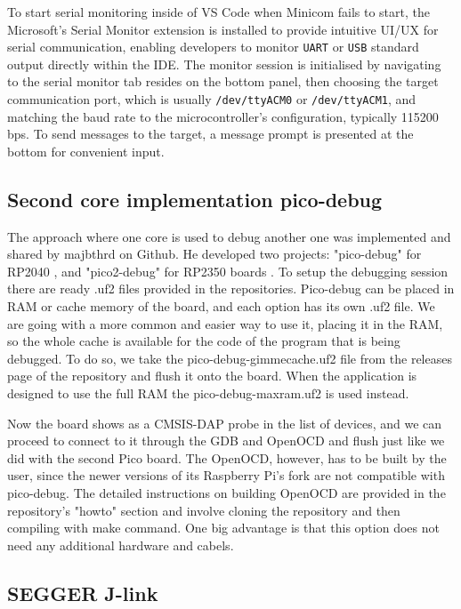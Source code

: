 To start serial monitoring inside of VS Code when Minicom fails to start, the Microsoft's Serial Monitor extension is installed to provide intuitive UI/UX for serial communication, enabling developers to monitor \texttt{UART} or \texttt{USB} standard output directly within the IDE. The monitor session is initialised by navigating to the serial monitor tab resides on the bottom panel, then choosing the target communication port, which is usually \texttt{/dev/ttyACM0} or \texttt{/dev/ttyACM1}, and matching the baud rate to the microcontroller's configuration, typically 115200 bps. To send messages to the target, a message prompt is presented at the bottom for convenient input.

\subsection{Second core implementation \- pico-debug}

The approach where one core is used to debug another one was implemented and shared by majbthrd on Github. He developed two projects: "pico-debug" for RP2040 \cite{pico_debug}, and "pico2-debug" for RP2350 boards \cite{pico2_debug}. To setup the debugging session there are ready .uf2 files provided in the repositories. Pico-debug can be placed in RAM or cache memory of the board, and each option has its own .uf2 file. We are going with a more common and easier way to use it, placing it in the RAM, so the whole cache is available for the code of the program that is being debugged. To do so, we take the pico-debug-gimmecache.uf2 file from the releases page of the repository and flush it onto the board. When the application is designed to use the full RAM the pico-debug-maxram.uf2 is used instead.

Now the board shows as a CMSIS-DAP probe in the list of devices, and we can proceed to connect to it through the GDB and OpenOCD and flush just like we did with the second Pico board. The OpenOCD, however, has to be built by the user, since the newer versions of its Raspberry Pi's fork are not compatible with pico-debug. The detailed instructions on building OpenOCD are provided in the repository's "howto" section \cite{pico_debug} and involve cloning the repository and then compiling with make command. One big advantage is that this option does not need any additional hardware and cabels. 

\subsection{SEGGER J-link}

